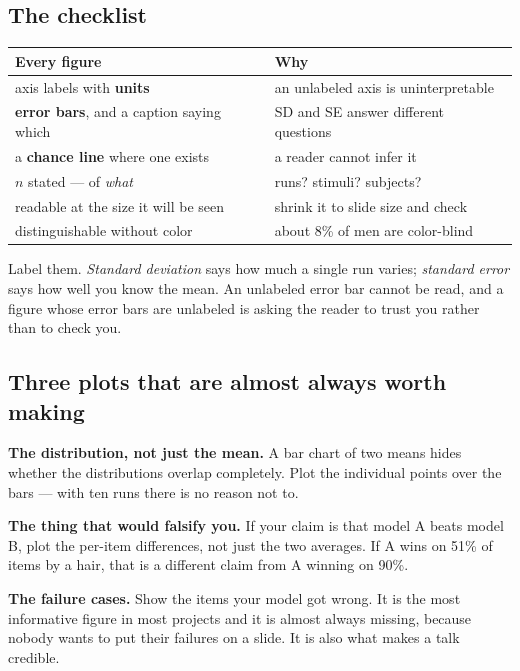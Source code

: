 \documentclass[11pt]{article}
\begin{document}
\subsection{The checklist}

\begin{center}
\begin{tabular}{@{}ll@{}}
\toprule
Every figure & Why \\
\midrule
axis labels with \textbf{units} & an unlabeled axis is uninterpretable \\
\textbf{error bars}, and a caption saying which & SD and SE answer different questions \\
a \textbf{chance line} where one exists & a reader cannot infer it \\
$n$ stated --- of \emph{what} & runs? stimuli? subjects? \\
readable at the size it will be seen & shrink it to slide size and check \\
distinguishable without color & about 8\% of men are color-blind \\
\bottomrule
\end{tabular}
\end{center}

\begin{keybox}
 Label them. \emph{Standard deviation} says
how much a single run varies; \emph{standard error} says how well you know the
mean. An unlabeled error bar cannot be read, and a figure whose error bars are
unlabeled is asking the reader to trust you rather than to check you.
\end{keybox}

\subsection{Three plots that are almost always worth making}

\textbf{The distribution, not just the mean.} A bar chart of two means hides
whether the distributions overlap completely. Plot the individual points over the
bars --- with ten runs there is no reason not to.

\textbf{The thing that would falsify you.} If your claim is that model A beats
model B, plot the per-item differences, not just the two averages. If A wins on
51\% of items by a hair, that is a different claim from A winning on 90\%.

\textbf{The failure cases.} Show the items your model got wrong. It is the most
informative figure in most projects and it is almost always missing, because
nobody wants to put their failures on a slide. It is also what makes a talk
credible.
\end{document}
